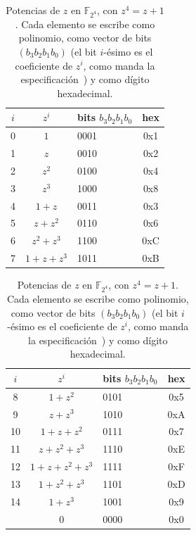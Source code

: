 \documentclass[11pt,a4paper,oneside]{report}
\newcommand{\F}{\mathbb{F}}
\newcommand{\FF}[1]{\F_{2^{#1}}}
\begin{document}
\begin{table}[htbp]
\centering
\caption{Potencias de $z$ en $\FF4$, con $z^4=z+1$. Cada elemento se
escribe como polinomio, como vector de bits $(b_3 b_2 b_1 b_0)$ (el bit
$i$-ésimo es el coeficiente de $z^i$, como manda la
especificación~\cite{cmspec}) y como dígito hexadecimal.}
\label{tab:gf16}
\small
\begin{minipage}[t]{0.49\textwidth}\centering
\begin{tabular}{@{}cclc@{}}
\toprule
$i$ & $z^i$ & bits $b_3b_2b_1b_0$ & hex \\
\midrule
0 & $1$ & 0001 & 0x1 \\
1 & $z$ & 0010 & 0x2 \\
2 & $z^2$ & 0100 & 0x4 \\
3 & $z^3$ & 1000 & 0x8 \\
4 & $1+z$ & 0011 & 0x3 \\
5 & $z+z^2$ & 0110 & 0x6 \\
6 & $z^2+z^3$ & 1100 & 0xC \\
7 & $1+z+z^3$ & 1011 & 0xB \\
\bottomrule
\end{tabular}
\end{minipage}\hfill
\begin{minipage}[t]{0.49\textwidth}\centering
\begin{tabular}{@{}cclc@{}}
\toprule
$i$ & $z^i$ & bits $b_3b_2b_1b_0$ & hex \\
\midrule
8 & $1+z^2$ & 0101 & 0x5 \\
9 & $z+z^3$ & 1010 & 0xA \\
10 & $1+z+z^2$ & 0111 & 0x7 \\
11 & $z+z^2+z^3$ & 1110 & 0xE \\
12 & $1+z+z^2+z^3$ & 1111 & 0xF \\
13 & $1+z^2+z^3$ & 1101 & 0xD \\
14 & $1+z^3$ & 1001 & 0x9 \\
\phantom{0} & $0$ & 0000 & 0x0 \\
\bottomrule
\end{tabular}
\end{minipage}
\end{table}
\end{document}

